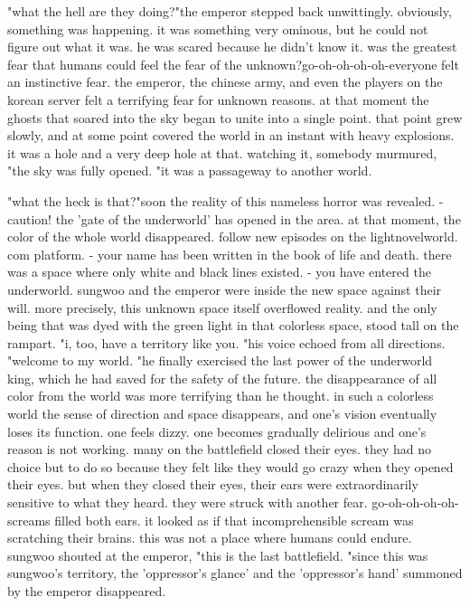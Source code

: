 "what the hell are they doing?"the emperor stepped back unwittingly.
 obviously, something was happening.
 it was something very ominous, but he could not figure out what it was.
 he was scared because he didn't know it.
was the greatest fear that humans could feel the fear of the unknown?go-oh-oh-oh-oh-everyone felt an instinctive fear.
 the emperor, the chinese army, and even the players on the korean server felt a terrifying fear for unknown reasons.
at that moment the ghosts that soared into the sky began to unite into a single point.
 that point grew slowly, and at some point covered the world in an instant with heavy explosions.
 it was a hole and a very deep hole at that.
 watching it, somebody murmured, "the sky was fully opened.
"it was a passageway to another world.

"what the heck is that?"soon the reality of this nameless horror was revealed.
- caution! the 'gate of the underworld' has opened in the area.
at that moment, the color of the whole world disappeared.
follow new episodes on the lightnovelworld.
com platform.
- your name has been written in the book of life and death.
there was a space where only white and black lines existed.
- you have entered the underworld.
sungwoo and the emperor were inside the new space against their will.
 more precisely, this unknown space itself overflowed reality.
 and the only being that was dyed with the green light in that colorless space, stood tall on the rampart.
"i, too, have a territory like you.
"his voice echoed from all directions.
"welcome to my world.
"he finally exercised the last power of the underworld king, which he had saved for the safety of the future.
the disappearance of all color from the world was more terrifying than he thought.
in such a colorless world the sense of direction and space disappears, and one's vision eventually loses its function.
 one feels dizzy.
 one becomes gradually delirious and one's reason is not working.
 many on the battlefield closed their eyes.
 they had no choice but to do so because they felt like they would go crazy when they opened their eyes.
 but when they closed their eyes, their ears were extraordinarily sensitive to what they heard.
 they were struck with another fear.
 go-oh-oh-oh-oh-screams filled both ears.
 it looked as if that incomprehensible scream was scratching their brains.
 this was not a place where humans could endure.
sungwoo shouted at the emperor, "this is the last battlefield.
"since this was sungwoo's territory, the 'oppressor's glance' and the 'oppressor's hand' summoned by the emperor disappeared.
